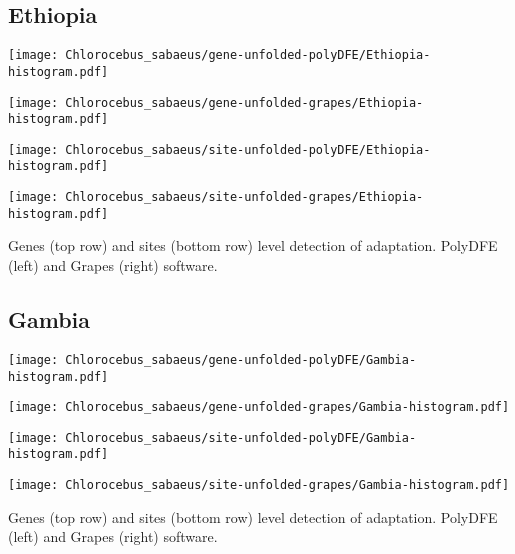 \documentclass{article}
\begin{document}
\subsection{Ethiopia}
\centering
\begin{minipage}{0.49\linewidth}
    \texttt{[image: Chlorocebus\_sabaeus/gene-unfolded-polyDFE/Ethiopia-histogram.pdf]}
\end{minipage}%
\hfill
\begin{minipage}{0.49\linewidth}
    \texttt{[image: Chlorocebus\_sabaeus/gene-unfolded-grapes/Ethiopia-histogram.pdf]}
\end{minipage}
\begin{minipage}{0.49\linewidth}
    \texttt{[image: Chlorocebus\_sabaeus/site-unfolded-polyDFE/Ethiopia-histogram.pdf]}
\end{minipage}%
\hfill
\begin{minipage}{0.49\linewidth}
    \texttt{[image: Chlorocebus\_sabaeus/site-unfolded-grapes/Ethiopia-histogram.pdf]}
\end{minipage}
\flushleft
Genes (top row) and sites (bottom row) level detection of adaptation.
PolyDFE (left) and Grapes (right) software.

\subsection{Gambia}
\centering
\begin{minipage}{0.49\linewidth}
    \texttt{[image: Chlorocebus\_sabaeus/gene-unfolded-polyDFE/Gambia-histogram.pdf]}
\end{minipage}%
\hfill
\begin{minipage}{0.49\linewidth}
    \texttt{[image: Chlorocebus\_sabaeus/gene-unfolded-grapes/Gambia-histogram.pdf]}
\end{minipage}
\begin{minipage}{0.49\linewidth}
    \texttt{[image: Chlorocebus\_sabaeus/site-unfolded-polyDFE/Gambia-histogram.pdf]}
\end{minipage}%
\hfill
\begin{minipage}{0.49\linewidth}
    \texttt{[image: Chlorocebus\_sabaeus/site-unfolded-grapes/Gambia-histogram.pdf]}
\end{minipage}
\flushleft
Genes (top row) and sites (bottom row) level detection of adaptation.
PolyDFE (left) and Grapes (right) software.
\end{document}

